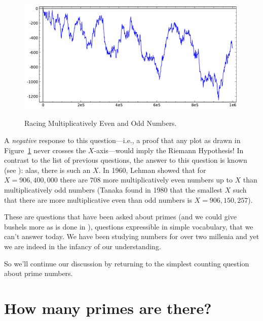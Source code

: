 \documentclass[openany]{book}
\theoremstyle{plain}
\theoremstyle{definition}
\begin{document}
\begin{figure}[H]
\includegraphics[width=.4\textwidth]{illustrations/liouville-1000000}\\
\caption{Racing Multiplicatively Even and Odd Numbers.\label{fig:liouville}}
\end{figure}

A {\em negative} response to this question---i.e., a proof that any
plot as drawn in Figure~\ref{fig:liouville} never crosses
the $X$-axis---would imply the Riemann Hypothesis!  In contrast to the list of
previous questions, the answer to this question is known (see ): alas, there is such an $X$.  In 1960, Lehman showed that
for $X=906,400,000$ there are $708$ more multiplicatively even numbers
up to $X$ than multiplicatively odd numbers (Tanaka found in 1980 that
the smallest $X$ such that there are more multiplicative even than odd
numbers is $X=906,150,257$).

These are questions that have been asked about primes (and we could
give bushels more as is done in ),
questions expressible in simple vocabulary, that
we can't answer today. We have been studying numbers for over two
millenia and yet we are indeed in the infancy of our understanding.


So we'll continue our discussion by returning to the simplest counting
question about prime numbers.

\chapter{How many primes are there?}
\end{document}
